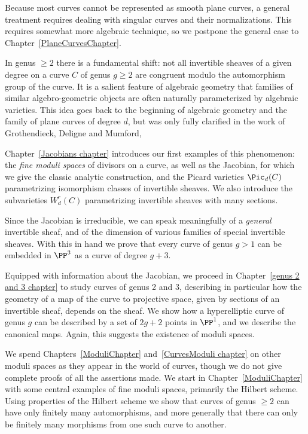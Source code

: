 Because most curves cannot be represented as smooth plane curves, a general treatment requires dealing with
singular curves and their normalizations. This requires somewhat more algebraic technique, so we postpone the general case to Chapter~\ref{PlaneCurvesChapter}.  

In genus $\geq 2$ there is a fundamental shift: not all invertible sheaves of a given degree on a curve $C$ of genus $g \geq 2$ are congruent modulo the automorphism group of the curve.
It is a salient feature of algebraic geometry that families of similar algebro-geometric objects are often naturally parameterized by algebraic varieties. This idea goes back to the beginning of algebraic geometry and the family of plane curves of degree $d$, but was only fully clarified in the work of Grothendieck, Deligne and Mumford,

Chapter~\ref{Jacobians chapter} introduces our first examples of this phenomenon: the \emph{fine moduli spaces} of divisors on a curve, as well as the Jacobian, for which we give the classic analytic construction, and the Picard varieties $\Pic_d(C)$ parametrizing isomorphism classes of invertible sheaves. We also introduce the subvarieties $W^{r}_{d}(C)$ parametrizing invertible sheaves with many sections. 

 Since the Jacobian is irreducible, we can speak meaningfully of a \emph{general} invertible sheaf, and of the dimension of various families of special invertible sheaves. With this in hand we prove
that every curve of genus $g>1$ can be embedded in $\PP^{3}$ as a curve of degree $g+3$.

Equipped with information about the Jacobian, we proceed in Chapter~\ref{genus 2 and 3 chapter} to study curves of genus 2 and 3, describing in particular how the geometry of a map of the curve to projective space,  given by sections of an invertible sheaf, depends on the sheaf. We show how a hyperelliptic curve of genus $g$
can be described by a set of $2g+2$ points in $\PP^{1}$, and we describe the canonical maps. Again, this
suggests the existence of moduli spaces.

We spend Chapters~\ref{ModuliChapter} and~\ref{CurvesModuli chapter} on other moduli spaces as they appear in the world of curves, though we do not give complete proofs of all the assertions made. We start in Chapter~\ref{ModuliChapter} with some central examples of fine moduli spaces, primarily
the Hilbert scheme. Using properties of the Hilbert scheme we show that curves of genus $\geq 2$
can have only finitely many automorphisms, and more generally that there can only be finitely
many morphisms from one such curve to another.

